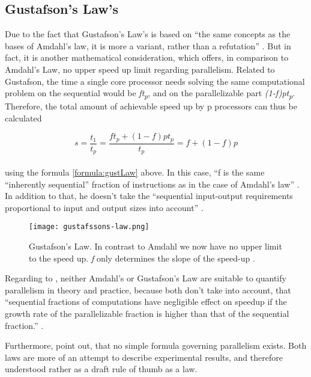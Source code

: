 \newpage

\subsection{Gustafson’s Law's}

Due to the fact that Gustafson’s Law's is based on ``the same concepts as the
bases of Amdahl’s law, it is more a variant, rather than a refutation'' \parencite[see][p81]{inbook1}. But in fact, it is another mathematical consideration, which offers, in comparison to Amdahl's Law, no upper speed up limit regarding parallelism. Related to Gustafson, the time a single core processor needs solving the same computational problem on the sequential would be \textit{ft\textsubscript{p}}, and on the parallelizable part \textit{(1-f)pt\textsubscript{p}}. Therefore, the total amount of achievable speed up by p processors can thus be calculated

\begin{equation} \label{formula:gustLaw}
	s = \frac{t_1}{t_p} = \frac{ft_p + (1 - f)pt_p}{t_p} = f + (1 - f)p
\end{equation}
\\[2pt]
using the formula \ref{formula:gustLaw} above. In this case, ``f is the same “inherently sequential” fraction of instructions as in the case of Amdahl’s law'' \parencite[see][p81]{inbook1}. In addition to that, he doesn't take the ``sequential input-output requirements proportional to input and output sizes into account'' \parencite[see][p81]{inbook1}.

\begin{figure}[h!]
	\centering
	\texttt{[image: gustafssons-law.png]}
	\caption{
		Gustafson’s Law. In contrast to Amdahl we now have no upper limit to the speed up. \textit{f} only determines the slope of the speed-up \parencite{article19}.
	}
	\label{fig:gustLaw}
\end{figure}

Regarding to \parencite{inbook1}, neither Amdahl's or Gustafson’s Law are suitable to quantify parallelism in theory and practice, because both don't take into account, that ``sequential fractions of computations have negligible effect on speedup if the growth rate of the parallelizable fraction is higher than that of the sequential fraction.'' \parencite[see][Chapter 7, p88]{inbook1}.

Furthermore, \parencite{inbook1} point out, that no simple formula governing parallelism exists. Both laws are more of an attempt to describe experimental results, and therefore understood rather as a draft rule of thumb as a law.

